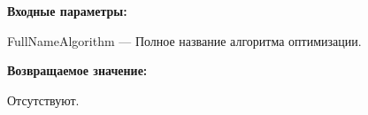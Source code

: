 \textbf{Входные параметры:}

FullNameAlgorithm --- Полное название алгоритма оптимизации.

\textbf{Возвращаемое значение:}

Отсутствуют.